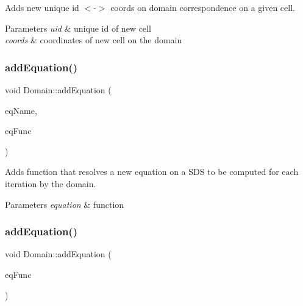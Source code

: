 Adds new unique id $<$-\/$>$ coords on domain correspondence on a given cell. 


\begin{DoxyParams}{Parameters}
{\em uid} & unique id of new cell \\
\hline
{\em coords} & coordinates of new cell on the domain \\
\hline
\end{DoxyParams}
\mbox{\label{classDomain_a3be46362fe91960104764d9eb89f1d29}} 
\subsubsection{\texorpdfstring{add\+Equation()}{addEquation()}\hspace{0.1cm}{\footnotesize\ttfamily [1/2]}}
{\footnotesize\ttfamily void Domain\+::add\+Equation (\begin{DoxyParamCaption}\item[{std\+::string}]{eq\+Name,  }\item[{eq\+Type}]{eq\+Func }\end{DoxyParamCaption})}



Adds function that resolves a new equation on a S\+DS to be computed for each iteration by the domain. 


\begin{DoxyParams}{Parameters}
{\em equation} & function \\
\hline
\end{DoxyParams}
\mbox{\label{classDomain_ab24a61d835dbebec7ff689ec8c7f2a95}} 
\subsubsection{\texorpdfstring{add\+Equation()}{addEquation()}\hspace{0.1cm}{\footnotesize\ttfamily [2/2]}}
{\footnotesize\ttfamily void Domain\+::add\+Equation (\begin{DoxyParamCaption}\item[{eq\+Type}]{eq\+Func }\end{DoxyParamCaption})}



